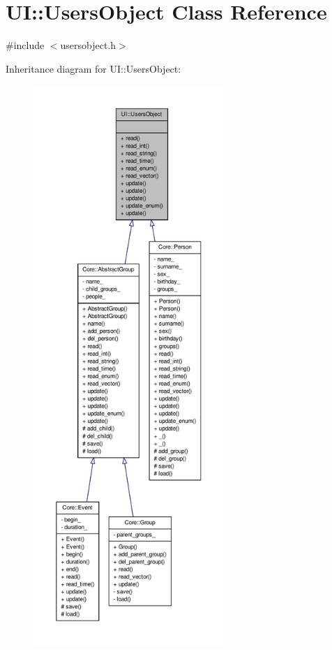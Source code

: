 \hypertarget{classUI_1_1UsersObject}{
\section{UI::UsersObject Class Reference}
\label{df/d0b/classUI_1_1UsersObject}
}


{\ttfamily \#include $<$usersobject.h$>$}



Inheritance diagram for UI::UsersObject:
\nopagebreak
\begin{figure}[H]
\begin{center}
\leavevmode
\includegraphics[height=600pt]{df/d9e/classUI_1_1UsersObject__inherit__graph}
\end{center}
\end{figure}
